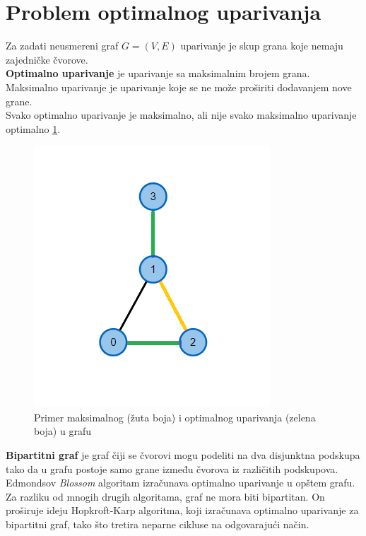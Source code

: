 \documentclass[11pt,a4paper]{article}
\theoremstyle{definition}
\begin{document}
\section{Problem optimalnog uparivanja}
Za zadati neusmereni graf $G=(V,E)$ uparivanje je skup grana koje nemaju zajedničke čvorove.\\ \textbf{Optimalno uparivanje} je uparivanje sa maksimalnim brojem grana.\cite{knjiga1}\\ Maksimalno uparivanje je uparivanje koje se ne može proširiti dodavanjem nove grane.\\ Svako optimalno uparivanje je maksimalno, ali nije svako maksimalno uparivanje optimalno \ref{fig:slika 1}.
\begin{figure}[H]
\begin{center}
\includegraphics[scale=0.7]{graf1.png}
\end{center}
\caption{Primer maksimalnog (žuta boja) i optimalnog uparivanja (zelena boja) u grafu}
\label{fig:slika 1}
\end{figure}
\textbf{Bipartitni graf} je graf čiji se čvorovi mogu podeliti na dva disjunktna podskupa
tako da u grafu postoje samo grane između čvorova iz različitih podskupova.\\

Edmondsov \textit{Blossom} algoritam izračunava optimalno uparivanje u opštem grafu. Za razliku od mnogih drugih algoritama, graf ne mora biti bipartitan. On proširuje ideju Hopkroft-Karp algoritma, koji izračunava optimalno uparivanje za bipartitni graf, tako što tretira neparne cikluse na odgovarajući način.
\end{document}
